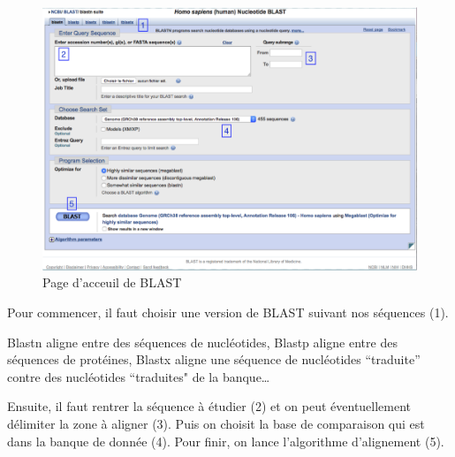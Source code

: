 \documentclass[12pt, openany]{report}
\begin{document}
\begin{figure}[H]
\begin{center}
    \includegraphics[scale=0.9]{Images/im4.png}
\caption{Page d’acceuil de BLAST}
\end{center}
\end{figure}

Pour commencer, il faut choisir une version de BLAST suivant nos séquences (1). 

Blastn aligne entre des séquences de nucléotides, Blastp aligne entre des séquences de protéines, Blastx aligne une séquence de nucléotides “traduite” contre des nucléotides “traduites" de la banque… 

Ensuite, il faut rentrer la séquence à étudier (2) et on peut éventuellement délimiter la zone à aligner (3). Puis on choisit la base de comparaison qui est dans la banque de donnée (4). Pour finir, on lance l’algorithme d’alignement (5). 
 
\end{document}
